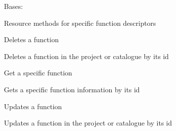 \documentclass[letterpaper,10pt,english]{sphinxmanual}
\begin{document}
\begin{fulllineitems}
\label{_source/son_editor.apis:son_editor.apis.project_functionsapi.Function}
Bases: 

Resource methods for specific function descriptors

\begin{fulllineitems}
\label{_source/son_editor.apis:son_editor.apis.project_functionsapi.Function.delete}
Deletes a  function

Deletes a function in the project or catalogue by its id

\end{fulllineitems}


\begin{fulllineitems}
\label{_source/son_editor.apis:son_editor.apis.project_functionsapi.Function.get}
Get a specific function

Gets a specific function information by its id

\end{fulllineitems}


\begin{fulllineitems}
\label{_source/son_editor.apis:son_editor.apis.project_functionsapi.Function.methods}
\end{fulllineitems}


\begin{fulllineitems}
\label{_source/son_editor.apis:son_editor.apis.project_functionsapi.Function.put}
Updates a function

Updates a function in the project or catalogue by its id

\end{fulllineitems}


\end{fulllineitems}
\end{document}

